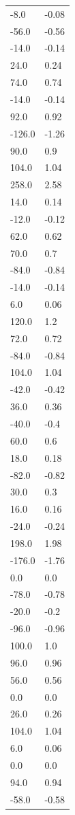 \begin{longtable}{ll}
-8.0 & -0.08 \\
-56.0 & -0.56 \\
-14.0 & -0.14 \\
24.0 & 0.24 \\
74.0 & 0.74 \\
-14.0 & -0.14 \\
92.0 & 0.92 \\
-126.0 & -1.26 \\
90.0 & 0.9 \\
104.0 & 1.04 \\
258.0 & 2.58 \\
14.0 & 0.14 \\
-12.0 & -0.12 \\
62.0 & 0.62 \\
70.0 & 0.7 \\
-84.0 & -0.84 \\
-14.0 & -0.14 \\
6.0 & 0.06 \\
120.0 & 1.2 \\
72.0 & 0.72 \\
-84.0 & -0.84 \\
104.0 & 1.04 \\
-42.0 & -0.42 \\
36.0 & 0.36 \\
-40.0 & -0.4 \\
60.0 & 0.6 \\
18.0 & 0.18 \\
-82.0 & -0.82 \\
30.0 & 0.3 \\
16.0 & 0.16 \\
-24.0 & -0.24 \\
198.0 & 1.98 \\
-176.0 & -1.76 \\
0.0 & 0.0 \\
-78.0 & -0.78 \\
-20.0 & -0.2 \\
-96.0 & -0.96 \\
100.0 & 1.0 \\
96.0 & 0.96 \\
56.0 & 0.56 \\
0.0 & 0.0 \\
26.0 & 0.26 \\
104.0 & 1.04 \\
6.0 & 0.06 \\
0.0 & 0.0 \\
94.0 & 0.94 \\
-58.0 & -0.58 \\

\end{longtable}
